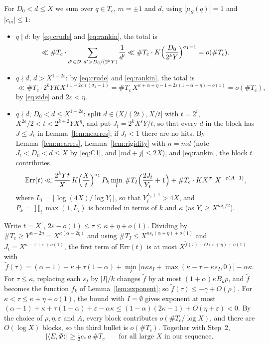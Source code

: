 \documentclass[11pt]{amsart}
\theoremstyle{remark}
\numberwithin{equation}{section}
\newcommand{\cD}{\mathcal{D}}
\newcommand{\eps}{\varepsilon}
\begin{document}
For $D_0<d\le X$ we sum over $q\in T_c$, $m=\pm1$ and $d$, using $|\mu_S(q)|=1$ and $|c_m|\le1$:
\begin{itemize}
\item $q\mid d$: by \eqref{eq:crude} and \eqref{eq:rankin}, the total is
\[
\ll\#T_c\cdot\sum_{d'\in\cD,\,d'>D_0/(2^kY)}\frac1{d'}\ll\#T_c\cdot K\Bigl(\frac{D_0}{2^kY}\Bigr)^{\sigma_1-1}=o(\#T_c).
\]
\item $q\nmid d$, $d>X^{1-2\eps}$: by \eqref{eq:crude} and \eqref{eq:rankin}, the total is
\[
\ll\#T_c\cdot2^kYKX^{(1-2\eps)(\sigma_1-1)}=\#T_c\,X^{\kappa+\alpha+\eta-1+2\eps(1-\alpha-\eta)+o(1)}=o(\#T_c),
\]
by \eqref{eq:side} and $2\eps<\eta$.
\item $q\nmid d$, $D_0<d\le X^{1-2\eps}$: split $d\in(X/(2t),X/t]$ with $t=2^i$, $X^{2\eps}/2<t<2^{k+2}YX^\eta$, and put $J_t=2^kX^{\eps}Y/t$, so that every $d$ in the block has $J\le J_t$ in Lemma~\ref{lem:nearres}; if $J_t<1$ there are no hits. By Lemma~\ref{lem:nearres}, Lemma~\ref{lem:rigidity} with $n=md$ (note $J_t<D_0<d\le X$ by \eqref{eq:C1}, and $|md+j|\le2X$), and \eqref{eq:rankin}, the block $t$ contributes
\[
\mathrm{Err}(t)\ll\frac{2^kYt}{X}\,K\Bigl(\frac Xt\Bigr)^{\sigma_1}\,P_k\min_{I}\,\#T_I\Bigl(\frac{2J_t}{Y_I}+1\Bigr)+\#T_c\cdot KX^{\sigma_1}X^{-\eps(A-1)} ,
\]
where $L_i=\lfloor\log(4X)/\log Y_i\rfloor$, so that $Y_i^{L_i+1}>4X$, and $P_k=\prod_i\max(1,L_i)$ is bounded in terms of $k$ and $\kappa$ (as $Y_i\ge X^{\kappa\lambda_i/2}$).
\end{itemize}
Write $t=X^{\tau}$, $2\eps-o(1)\le\tau\le\kappa+\eta+o(1)$. Dividing by $\#T_c\ge Y^{\alpha-2\eta}=X^{\kappa(\alpha-2\eta)}$ and using $\#T_I\le X^{\kappa s_I(\alpha+\eta)+o(1)}$ and $J_t=X^{\kappa-\tau+\eps+o(1)}$, the first term of $\mathrm{Err}(t)$ is at most $X^{\tilde f(\tau)+O(\eps+\eta)+o(1)}$ with
\[
\tilde f(\tau)=(\alpha-1)+\kappa+\tau(1-\alpha)+\min_I\bigl[\alpha\kappa s_I+\max(\kappa-\tau-\kappa s_I,0)\bigr]-\alpha\kappa .
\]
For $\tau\le\kappa$, replacing each $s_I$ by $|I|/k$ changes $\tilde f$ by at most $(1+\alpha)\kappa B_k\rho$, and $\tilde f$ becomes the function $f_k$ of Lemma~\ref{lem:exponent}; so $\tilde f(\tau)\le-\gamma+O(\rho)$. For $\kappa<\tau\le\kappa+\eta+o(1)$, the bound with $I=\emptyset$ gives exponent at most $(\alpha-1)+\kappa+\tau(1-\alpha)+\eps-\alpha\kappa\le(1-\alpha)(2\kappa-1)+O(\eta+\eps)<0$. By the choice of $\rho,\eta,\eps$ and $A$, every block contributes $o(\#T_c/\log X)$, and there are $O(\log X)$ blocks, so the third bullet is $o(\#T_c)$. Together with Step~2,
\begin{equation}\label{eq:EPhi}
|\langle E,\Phi\rangle|\ge\tfrac12c_*\,a\,\#T_c\qquad\text{for all large }X\text{ in our sequence.}
\end{equation}
\end{document}
